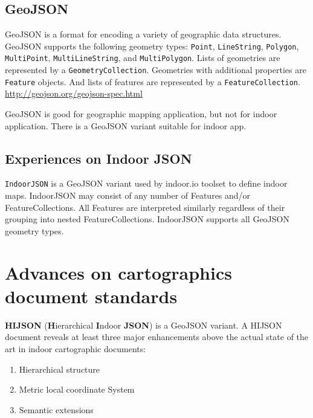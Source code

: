 \documentclass[]{article}
\begin{document}
\subsection{GeoJSON}\label{geojson}

GeoJSON is a format for encoding a variety of geographic data
structures. GeoJSON supports the following geometry types:
\texttt{Point}, \texttt{LineString}, \texttt{Polygon},
\texttt{MultiPoint}, \texttt{MultiLineString}, and
\texttt{MultiPolygon}. Lists of geometries are represented by a
\texttt{GeometryCollection}. Geometries with additional properties are
\texttt{Feature} objects. And lists of features are represented by a
\texttt{FeatureCollection}.
\href{GeoJSON\%20spec}{http://geojson.org/geojson-spec.html}

GeoJSON is good for geographic mapping application, but not for indoor
application. There is a GeoJSON variant suitable for indoor app.

\subsection{Experiences on Indoor
JSON}\label{experiences-on-indoor-json}

\texttt{IndoorJSON} is a GeoJSON variant used by indoor.io toolset to
define indoor maps. IndoorJSON may consist of any number of Features
and/or FeatureCollections. All Features are interpreted similarly
regardless of their grouping into nested FeatureCollections. IndoorJSON
supports all GeoJSON geometry types.

\section{Advances on cartographics document
standards}\label{advances-on-cartographics-document-standards}

\textbf{HIJSON} (\textbf{H}ierarchical \textbf{I}ndoor \textbf{JSON}) is
a GeoJSON variant. A HIJSON document reveals at least three major
enhancements above the actual state of the art in indoor cartographic
documents:

\begin{enumerate}
\def\labelenumi{\arabic{enumi}.}
\itemsep1pt\parskip0pt
\item
  Hierarchical structure
\item
  Metric local coordinate System
\item
  Semantic extensions
\end{enumerate}
\end{document}
